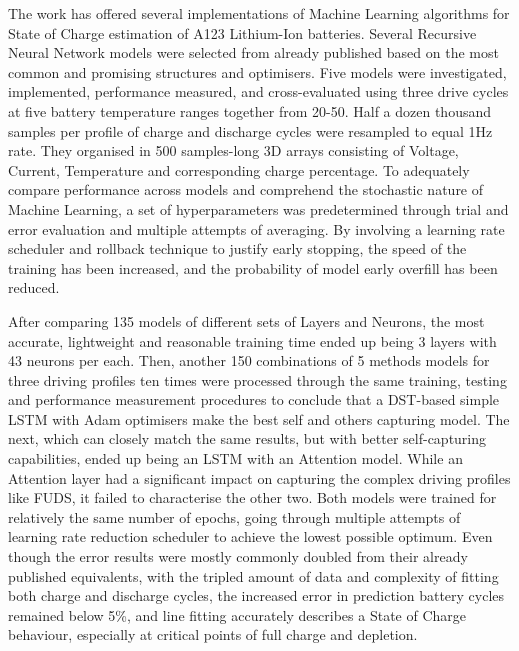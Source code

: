 
%
%
The work has offered several implementations of Machine Learning algorithms for State of Charge estimation of A123 Lithium-Ion batteries.
Several Recursive Neural Network models were selected from already published based on the most common and promising structures and optimisers.
Five models were investigated, implemented, performance measured, and cross-evaluated using three drive cycles at five battery temperature ranges together from 20-50\textdegree{}.
Half a dozen thousand samples per profile of charge and discharge cycles were resampled to equal 1Hz rate.
They organised in 500 samples-long 3D arrays consisting of Voltage, Current, Temperature and corresponding charge percentage.
To adequately compare performance across models and comprehend the stochastic nature of Machine Learning, a set of hyperparameters was predetermined through trial and error evaluation and multiple attempts of averaging.
By involving a learning rate scheduler and rollback technique to justify early stopping, the speed of the training has been increased, and the probability of model early overfill has been reduced.

%
%
After comparing 135 models of different sets of Layers and Neurons, the most accurate, lightweight and reasonable training time ended up being 3 layers with 43 neurons per each.
Then, another 150 combinations of 5 methods models for three driving profiles ten times were processed through the same training, testing and performance measurement procedures to conclude that a DST-based simple LSTM with Adam optimisers make the best self and others capturing model.
The next, which can closely match the same results, but with better self-capturing capabilities, ended up being an LSTM with an Attention model.
While an Attention layer had a significant impact on capturing the complex driving profiles like FUDS, it failed to characterise the other two.
Both models were trained for relatively the same number of epochs, going through multiple attempts of learning rate reduction scheduler to achieve the lowest possible optimum.
Even though the error results were mostly commonly doubled from their already published equivalents, with the tripled amount of data and complexity of fitting both charge and discharge cycles, the increased error in prediction battery cycles remained below 5\%, and line fitting accurately describes a State of Charge behaviour, especially at critical points of full charge and depletion.

